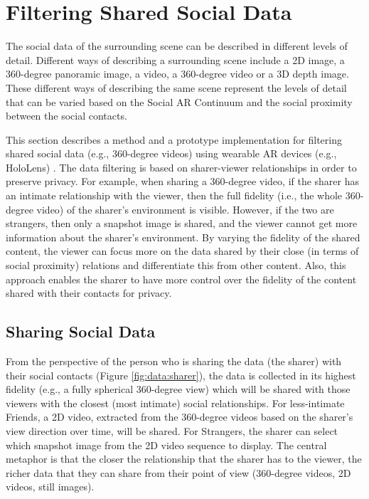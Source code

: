 \section{Filtering Shared Social Data}
\label{sec:surrounding:360}

The social data of the surrounding scene can be described in different levels of detail. Different ways of describing a surrounding scene include a 2D image, a 360-degree panoramic image, a video, a 360-degree video or a 3D depth image. These different ways of describing the same scene represent the levels of detail that can be varied based on the Social AR Continuum and the social proximity between the social contacts. 

This section describes a method and a prototype implementation for filtering shared social data (e.g., 360-degree videos) using wearable AR devices (e.g., HoloLens) \cite{Nassani2018a}. The data filtering is based on sharer-viewer relationships in order to preserve privacy. For example, when sharing a 360-degree video, if the sharer has an intimate relationship with the viewer, then the full fidelity (i.e., the whole 360-degree video) of the sharer's environment is visible. However, if the two are strangers, then only a snapshot image is shared, and the viewer cannot get more information about the sharer's environment. By varying the fidelity of the shared content, the viewer can focus more on the data shared by their close (in terms of social proximity) relations and differentiate this from other content. Also, this approach enables the sharer to have more control over the fidelity of the content shared with their contacts for privacy.



\subsection{Sharing Social Data}

From the perspective of the person who is sharing the data (the sharer) with their social contacts (Figure \ref{fig:data:sharer}), the data is collected in its highest fidelity (e.g., a fully spherical 360-degree view) which will be shared with those viewers with the closest (most intimate) social relationships. For less-intimate Friends, a 2D video, extracted from the 360-degree videos based on the sharer's view direction over time, will be shared. For Strangers, the sharer can select which snapshot image from the 2D video sequence to display. The central metaphor is that the closer the relationship that the sharer has to the viewer, the richer data that they can share from their point of view (360-degree videos, 2D videos, still images).

